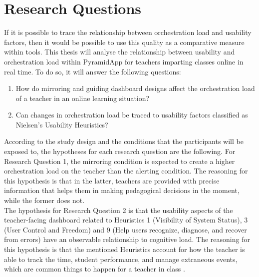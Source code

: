 \normallinespacing

\chapter{Research Questions} \label{research-questions}
If it is possible to trace the relationship between orchestration load and usability factors, then it would be possible to use this quality as a comparative measure within tools. This thesis will analyse the relationship between usability and orchestration load within PyramidApp for teachers imparting classes online in real time. To do so, it will answer the following questions:
\begin{enumerate}
    \item How do mirroring and guiding dashboard designs affect the orchestration load of a teacher in an online learning situation?
    \item Can changes in orchestration load be traced to usability factors classified as Nielsen's Usability Heuristics?
\end{enumerate}
According to the study design and the conditions that the participants will be exposed to, the hypotheses for each research question are the following. For Research Question 1, the mirroring condition is expected to create a higher orchestration load on the teacher than the alerting condition. The reasoning for this hypothesis is that in the latter, teachers are provided with precise information that helps them in making pedagogical decisions in the moment, while the former does not.\\
The hypothesis for Research Question 2 is that the usability aspects of the teacher-facing dashboard related to Heuristics 1 (Visibility of System Status), 3 (User Control and Freedom) and 9 (Help users recognize, diagnose, and recover from errors) have an observable relationship to cognitive load. The reasoning for this hypothesis is that the mentioned Heuristics account for how the teacher is able to track the time, student performance, and manage extraneous events, which are common things to happen for a teacher in class \cite{Dillenbourg2013-kx}.
\newpage


